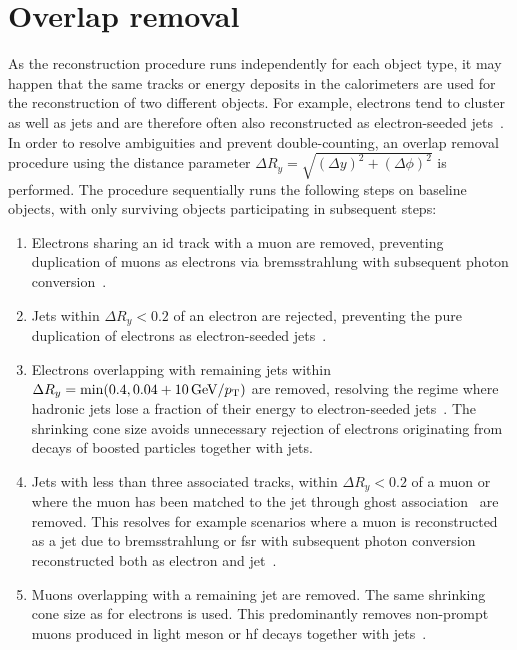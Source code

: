 \section{Overlap removal}\label{sec:overlap_removal}

As the reconstruction procedure runs independently for each object type, it may happen that the same tracks or energy deposits in the calorimeters are used for the reconstruction of two different objects. For example, electrons tend to cluster as well as jets and are therefore often also reconstructed as electron-seeded jets~\cite{overlapremoval:1700874}. In order to resolve ambiguities and prevent double-counting, an overlap removal procedure using the distance parameter $\Delta R_y = \sqrt{(\Delta y)^2+(\Delta \phi)^2}$ is performed. The procedure sequentially runs the following steps on baseline objects, with only surviving objects participating in subsequent steps:
\begin{enumerate}
	\item Electrons sharing an \gls{id} track with a muon are removed, preventing duplication of muons as electrons via bremsstrahlung with subsequent photon conversion~\cite{overlapremoval:1700874}.
	\item Jets within $\Delta R_y < 0.2$ of an electron are rejected, preventing the pure duplication of electrons as electron-seeded jets~\cite{overlapremoval:1700874}.
	\item Electrons overlapping with remaining jets within $\Delta R_y = \min (0.4, 0.04+\SI{10}{\GeV}/\pt)$ are removed, resolving the regime where hadronic jets lose a fraction of their energy to electron-seeded jets~\cite{overlapremoval:1700874}. The shrinking cone size avoids unnecessary rejection of electrons originating from decays of boosted particles together with jets.
	\item Jets with less than three associated tracks, within $\Delta R_y < 0.2$ of a muon or where the muon has been matched to the jet through ghost association~\cite{ghostassociation:2008gn} are removed. This resolves for example scenarios where a muon is reconstructed as a jet due to bremsstrahlung or \gls{fsr} with subsequent photon conversion reconstructed both as electron and jet~\cite{overlapremoval:1700874}.
	\item Muons overlapping with a remaining jet are removed. The same shrinking cone size as for electrons is used. This predominantly removes non-prompt muons produced in light meson or \gls{hf} decays together with jets~\cite{overlapremoval:1700874}. 
\end{enumerate} 


